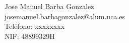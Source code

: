 Jose Manuel Barba Gonzalez \\ %
josemanuel.barbagonzalez@alum.uca.es \\ %
Teléfono: xxxxxxxx \\ %
NIF: 48899329H \\ %
